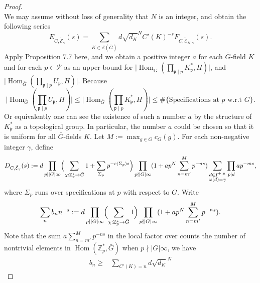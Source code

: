\documentclass{amsart}
\numberwithin{equation}{section}
\theoremstyle{plain}
\theoremstyle{definition}
\theoremstyle{remark}
\begin{document}
\begin{proof}
\begin{equation*}
	\end{equation*}
	We may assume without loss of generality that $N$ is an integer, and obtain the following series
	\begin{equation*}
		E_{C,\tilde{\mathcal{E}}_{\gamma}}(s)=\sum_{K\in\mathcal{E}(\bar{G})}d\sqrt{d_K}^NC'(K)^{-s}F_{C,\tilde{\mathcal{E}}_{K,\gamma}}(s).
	\end{equation*}
	Apply Proposition 7.7 here, and we obtain a positive integer $a$ for each $\bar{G}$-field $K$ and for each $p\in\mathcal{P}$ as an upper bound for $\lvert\operatorname{Hom}_{\bar{G}}(\prod_{\mathfrak{p}\mid p}K^*_{\mathfrak{p}},H)\rvert$,
	and $\lvert\operatorname{Hom}_{\bar{G}}(\prod_{\mathfrak{p}\mid p}U_{\mathfrak{p}},H)\rvert$.
	Because
	\begin{equation*}
		\lvert\operatorname{Hom}_{\bar{G}}(\prod_{\mathfrak{p}\mid p}U_{\mathfrak{p}},H)\rvert\leq\lvert\operatorname{Hom}_{\bar{G}}(\prod_{\mathfrak{p}\mid p}K_{\mathfrak{p}}^*,H)\rvert\leq\#\{\text{Specifications at }p\text{ w.r.t }G\}.
	\end{equation*}
	Or equivalently one can see the existence of such a number $a$ by the structure of $K^*_{\mathfrak{p}}$ as a topological group.
	In particular, the number $a$ could be chosen so that it is uniform for all $\bar{G}$-fields $K$.
	Let $M:=\max_{g\in G}c_G(g)$.
	For each non-negative integer $\gamma$, define
	\begin{equation*}
		D_{C,\tilde{\mathcal{E}}_{\gamma}}(s):=
		d\prod_{p\mid\lvert G\rvert\infty}\Bigl(\sum_{\chi:\mathbb{Z}_p^*\to\bar{G}}1+\sum_{\Sigma_p}p^{-c(\Sigma_p)s}\Bigr)
		\prod_{p\nmid\lvert G\rvert\infty}(1+ap^N\sum_{n=m'}^M p^{-ns})
		\sum_{
			\substack{
				d\in I^{+,\mu}\\
				\omega(d)=\gamma
			}
		}
		\prod_{p\mid d}ap^{-ms},
	\end{equation*}
	where $\Sigma_p$ runs over specifications at $p$ with respect to $G$.
	Write
	\begin{equation*}
		\sum_n b_nn^{-s}:=d\prod_{p\mid\lvert G\rvert\infty}\Bigl(\sum_{\chi:\mathbb{Z}_p^*\to\bar{G}}1\Bigr)\prod_{p\nmid\lvert G\rvert\infty}(1+ap^N\sum_{n=m'}^M p^{-ns}).
	\end{equation*}
	Note that the sum $a\sum_{n=m'}^M p^{-ns}$ in the local factor over counts the number of nontrivial elements in $\operatorname{Hom}(\mathbb{Z}_p^*,\bar{G})$ when $p\nmid\lvert G\rvert\infty$, we have
	\begin{equation*}
		\begin{aligned}
			b_n\geq&\sum_{C'(K)=n}d\sqrt{d_K}^N

\end{aligned}
\end{equation*}
\end{proof}
\end{document}
